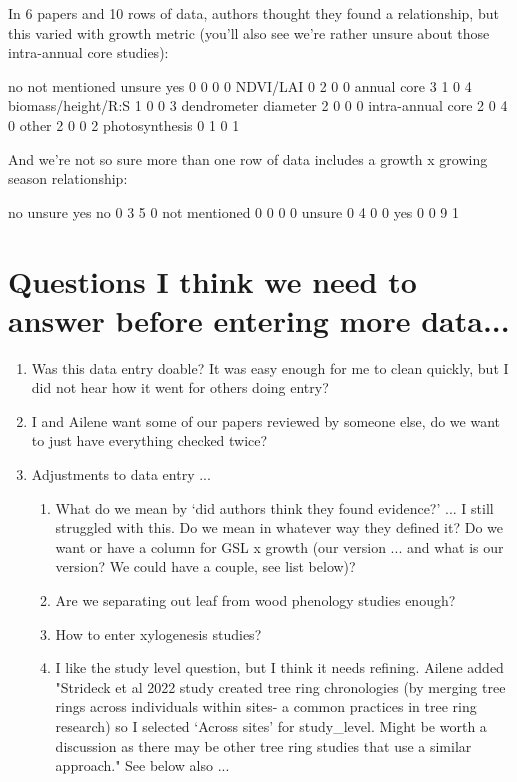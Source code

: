 \documentclass[11pt]{article}
\begin{document}
In 6 papers and 10 rows of data, authors thought they found a relationship, but this varied with growth metric (you'll also see we're rather unsure about those intra-annual core studies):
\begin{Schunk}
\begin{Soutput}
                       no not mentioned unsure yes
                        0             0      0   0
  NDVI/LAI              0             2      0   0
  annual core           3             1      0   4
  biomass/height/R:S    1             0      0   3
  dendrometer diameter  2             0      0   0
  intra-annual core     2             0      4   0
  other                 2             0      0   2
  photosynthesis        0             1      0   1
\end{Soutput}
\end{Schunk}


And we're not so sure more than one row of data includes a growth x growing season relationship:
\begin{Schunk}
\begin{Soutput}
                  no unsure yes
  no            0  3      5   0
  not mentioned 0  0      0   0
  unsure        0  4      0   0
  yes           0  0      9   1
\end{Soutput}
\end{Schunk}

\section{Questions I think we need to answer before entering more data...}

\begin{enumerate}
\item Was this data entry doable? It was easy enough for me to clean quickly, but I did not hear how it went for others doing entry?
\item I and Ailene want some of our papers reviewed by someone else, do we want to just have everything checked twice?
\item Adjustments to data entry ...
\begin{enumerate}
\item What do we mean by `did authors think they found evidence?' ... I still struggled with this. Do we mean in whatever way they defined it? Do we want or have a column for GSL x growth (our version ... and what is our version? We could have a couple, see list below)? 
\item Are we separating out leaf from wood phenology studies enough?
\item How to enter xylogenesis studies?
\item I like the study level question, but I think it needs refining. Ailene added "Strideck et al 2022 study created tree ring chronologies (by merging tree rings across individuals within sites- a common practices in tree ring research) so I selected `Across sites' for study\_level. Might be worth a discussion as there may be other tree ring studies that use a similar approach." See below also ...
\end{enumerate}
\end{enumerate}
\end{document}
